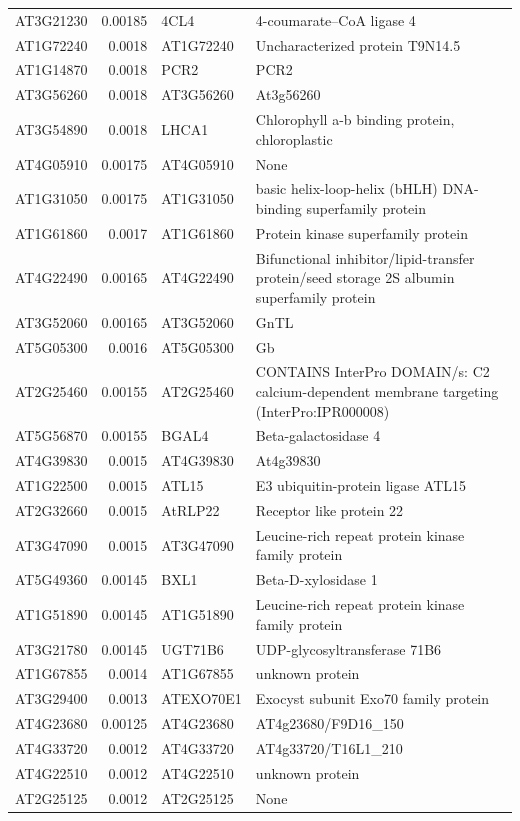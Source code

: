 \documentclass[11pt]{article}
\begin{document}
\begin{center}
\begin{tabular}{lrll}
AT3G21230 & 0.00185 & 4CL4 & 4-coumarate--CoA ligase 4\\
AT1G72240 & 0.0018 & AT1G72240 & Uncharacterized protein T9N14.5\\
AT1G14870 & 0.0018 & PCR2 & PCR2\\
AT3G56260 & 0.0018 & AT3G56260 & At3g56260\\
AT3G54890 & 0.0018 & LHCA1 & Chlorophyll a-b binding protein, chloroplastic\\
AT4G05910 & 0.00175 & AT4G05910 & None\\
AT1G31050 & 0.00175 & AT1G31050 & basic helix-loop-helix (bHLH) DNA-binding superfamily protein\\
AT1G61860 & 0.0017 & AT1G61860 & Protein kinase superfamily protein\\
AT4G22490 & 0.00165 & AT4G22490 & Bifunctional inhibitor/lipid-transfer protein/seed storage 2S albumin superfamily protein\\
AT3G52060 & 0.00165 & AT3G52060 & GnTL\\
AT5G05300 & 0.0016 & AT5G05300 & Gb\\
AT2G25460 & 0.00155 & AT2G25460 & CONTAINS InterPro DOMAIN/s: C2 calcium-dependent membrane targeting (InterPro:IPR000008)\\
AT5G56870 & 0.00155 & BGAL4 & Beta-galactosidase 4\\
AT4G39830 & 0.0015 & AT4G39830 & At4g39830\\
AT1G22500 & 0.0015 & ATL15 & E3 ubiquitin-protein ligase ATL15\\
AT2G32660 & 0.0015 & AtRLP22 & Receptor like protein 22\\
AT3G47090 & 0.0015 & AT3G47090 & Leucine-rich repeat protein kinase family protein\\
AT5G49360 & 0.00145 & BXL1 & Beta-D-xylosidase 1\\
AT1G51890 & 0.00145 & AT1G51890 & Leucine-rich repeat protein kinase family protein\\
AT3G21780 & 0.00145 & UGT71B6 & UDP-glycosyltransferase 71B6\\
AT1G67855 & 0.0014 & AT1G67855 & unknown protein\\
AT3G29400 & 0.0013 & ATEXO70E1 & Exocyst subunit Exo70 family protein\\
AT4G23680 & 0.00125 & AT4G23680 & AT4g23680/F9D16\_150\\
AT4G33720 & 0.0012 & AT4G33720 & AT4g33720/T16L1\_210\\
AT4G22510 & 0.0012 & AT4G22510 & unknown protein\\
AT2G25125 & 0.0012 & AT2G25125 & None\\
\end{tabular}
\end{center}
\end{document}
